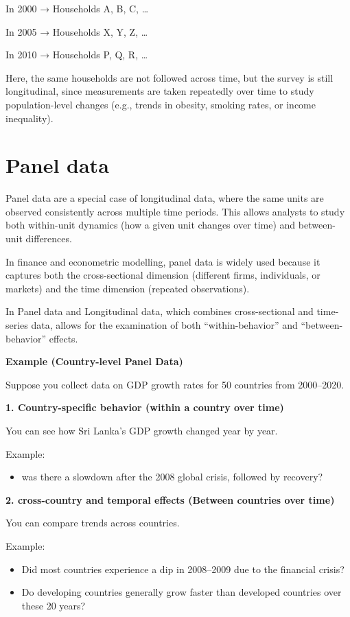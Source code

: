 \documentclass[
  11pt,
  a4paper,
]{report}
\providecommand{\tightlist}{%
  \setlength{\itemsep}{0pt}\setlength{\parskip}{0pt}}\usepackage{longtable,booktabs,array}
\begin{document}
In 2000 → Households A, B, C, \ldots{}

In 2005 → Households X, Y, Z, \ldots{}

In 2010 → Households P, Q, R, \ldots{}

Here, the same households are not followed across time, but the survey
is still longitudinal, since measurements are taken repeatedly over time
to study population-level changes (e.g., trends in obesity, smoking
rates, or income inequality).

\section{Panel data}\label{panel-data}

Panel data are a special case of longitudinal data, where the same units
are observed consistently across multiple time periods. This allows
analysts to study both within-unit dynamics (how a given unit changes
over time) and between-unit differences.

In finance and econometric modelling, panel data is widely used because
it captures both the cross-sectional dimension (different firms,
individuals, or markets) and the time dimension (repeated observations).

In Panel data and Longitudinal data, which combines cross-sectional and
time-series data, allows for the examination of both ``within-behavior''
and ``between-behavior'' effects.

\textbf{Example (Country-level Panel Data)}

Suppose you collect data on GDP growth rates for 50 countries from
2000--2020.

\textbf{1. Country-specific behavior (within a country over time)}

You can see how Sri Lanka's GDP growth changed year by year.

Example:

\begin{itemize}
\tightlist
\item
  was there a slowdown after the 2008 global crisis, followed by
  recovery?
\end{itemize}

\textbf{2. cross-country and temporal effects (Between countries over
time)}

You can compare trends across countries.

Example:

\begin{itemize}
\item
  Did most countries experience a dip in 2008--2009 due to the financial
  crisis?
\item
  Do developing countries generally grow faster than developed countries
  over these 20 years?
\end{itemize}
\end{document}
